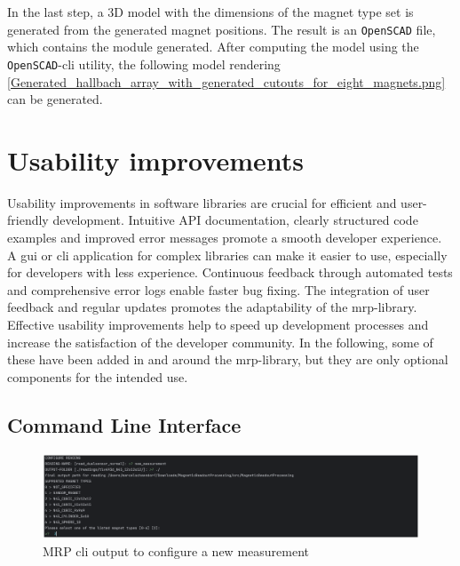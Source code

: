 In the last step, a 3D model with the dimensions of the magnet type set
is generated from the generated magnet positions. The result is an
\passthrough{\lstinline!OpenSCAD!}\cite{OpenSCAD} file, which
contains the module generated. After computing the model using the
\passthrough{\lstinline!OpenSCAD!}-\gls{cli} utility, the following
model rendering
\ref{Generated_hallbach_array_with_generated_cutouts_for_eight_magnets.png}
can be generated.

\hypertarget{usability-improvements}{%
\chapter{Usability improvements}\label{usability-improvements}}

Usability improvements in software libraries are crucial for efficient
and user-friendly development. Intuitive API documentation, clearly
structured code examples and improved error messages promote a smooth
developer experience. A \gls{gui} or \gls{cli} application for complex
libraries can make it easier to use, especially for developers with less
experience. Continuous feedback through automated tests and
comprehensive error logs enable faster bug fixing. The integration of
user feedback and regular updates promotes the adaptability of the
\gls{mrp}-library. Effective usability improvements help to speed up
development processes and increase the satisfaction of the developer
community. In the following, some of these have been added in and around
the \gls{mrp}-library, but they are only optional components for the
intended use.

\hypertarget{command-line-interface}{%
\section{Command Line Interface}\label{command-line-interface}}

\begin{figure}
\centering
\includegraphics{./generated_images/border_MRP_(+cli)_output_to_configure_a_new_measurement.png}
\caption{MRP \gls{cli} output to configure a new measurement
\label{MRP_(+cli)_output_to_configure_a_new_measurement.png}}
\end{figure}

